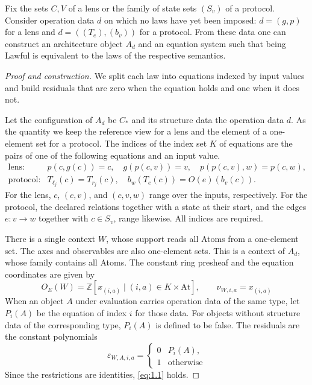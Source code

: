 \begin{proposition}\label{prop:1.41}

Fix the sets $C,V$ of a lens or the family of state sets $(S_v)$ of a protocol.
Consider operation data $d$ on which no laws have yet been imposed:
$d=(g,p)$ for a lens and $d=((T_e),(b_v))$ for a protocol.
From these data one can construct an architecture object $A_d$ and an equation
system such that being Lawful is equivalent to the laws of the respective
semantics.

\end{proposition}

\begin{proof}[Proof and construction]

We split each law into equations indexed by input values and build residuals
that are zero when the equation holds and one when it does not.

Let the configuration of $A_d$ be $C_*$ and its structure data the operation
data $d$.
As the quantity we keep the reference view for a lens and the element of a
one-element set for a protocol.
The indices of the index set $K$ of equations are the pairs of one of the
following equations and an input value.
\begin{equation*}
\begin{array}{ll}
\text{lens:}&
p(c,g(c))=c,\quad
g(p(c,v))=v,\quad
p(p(c,v),w)=p(c,w),\\[2pt]
\text{protocol:}&
T_{\ell_j}(c)=T_{r_j}(c),\quad
b_w(T_e(c))=O(e)(b_v(c)).
\end{array}
\tag{1.26}\label{eq:1.26}
\end{equation*}
For the lens, $c$, $(c,v)$, and $(c,v,w)$ range over the inputs, respectively.
For the protocol, the declared relations together with a state at their start,
and the edges $e:v\to w$ together with $c\in S_v$, range likewise.
All indices are required.

There is a single context $W$, whose support reads all Atoms from a
one-element set.
The axes and observables are also one-element sets.
This is a context of $A_d$, whose family contains all Atoms.
The constant ring presheaf and the equation coordinates are given by
\[
O_E(W)=\mathbb{Z}[x_{(i,a)}\mid (i,a)\in K\times\mathrm{At}],
\qquad \nu_{W,i,a}=x_{(i,a)}
\]
When an object $A$ under evaluation carries operation data of the same type,
let $P_i(A)$ be the equation of index $i$ for those data.
For objects without structure data of the corresponding type, $P_i(A)$ is
defined to be false.
The residuals are the constant polynomials
\begin{equation*}
\varepsilon_{W,A,i,a}=
\begin{cases}
0 & P_i(A),\\
1 & \text{otherwise}
\end{cases}
\tag{1.27}\label{eq:1.27}
\end{equation*}
Since the restrictions are identities, \eqref{eq:1.1} holds.


\end{proof}

